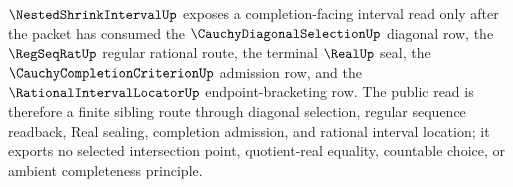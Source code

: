 $\NestedShrinkIntervalUp$ exposes a completion-facing interval read only after the packet has consumed the $\CauchyDiagonalSelectionUp$ diagonal row, the $\RegSeqRatUp$ regular rational route, the terminal $\RealUp$ seal, the $\CauchyCompletionCriterionUp$ admission row, and the $\RationalIntervalLocatorUp$ endpoint-bracketing row. The public read is therefore a finite sibling route through diagonal selection, regular sequence readback, Real sealing, completion admission, and rational interval location; it exports no selected intersection point, quotient-real equality, countable choice, or ambient completeness principle.
